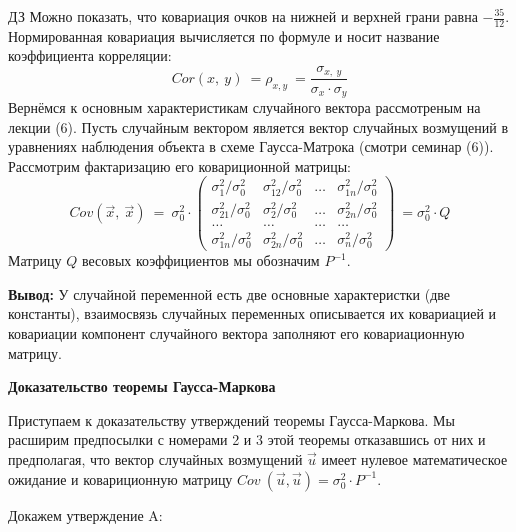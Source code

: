 \documentclass[12pt,a4paper]{article}
\begin{document}
\begin{center}
$\displaystyle \boxed{\text{ДЗ}}$ Можно показать, что ковариация очков на нижней и верхней грани равна $\displaystyle -\frac{35}{12}$. Нормированная ковариация вычисляется по формуле и носит название коэффициента корреляции:
\begin{equation*}
Cor( x,\ y) \ =\rho _{x,y} \ =\frac{\sigma _{x,\ y}}{\sigma _{x} \cdot \sigma _{y}}
\end{equation*}
Вернёмся к основным характеристикам случайного вектора рассмотреным на лекции (6). Пусть случайным вектором является вектор случайных возмущений в уравнениях наблюдения объекта в схеме Гаусса-Матрока (смотри семинар (6)). Рассмотрим фактаризацию его ковариционной матрицы:
\begin{equation*}
Cov\left(\vec{x} ,\ \vec{x}\right) \ =\ \sigma ^{2}_{0} \cdot \begin{pmatrix}
\sigma ^{2}_{1} /\sigma ^{2}_{0} & \sigma ^{2}_{12} /\sigma ^{2}_{0} & \dotsc  & \sigma ^{2}_{1n} /\sigma ^{2}_{0}\\
\sigma ^{2}_{21} /\sigma ^{2}_{0} & \sigma ^{2}_{2} /\sigma ^{2}_{0} & \dotsc  & \sigma ^{2}_{2n} /\sigma ^{2}_{0}\\
\dotsc  & \dotsc  & \dotsc  & \dotsc \\
\sigma ^{2}_{1n} /\sigma ^{2}_{0} & \sigma ^{2}_{2n} /\sigma ^{2}_{0} & \dotsc  & \sigma ^{2}_{n} /\sigma ^{2}_{0}
\end{pmatrix} \ =\sigma ^{2}_{0} \cdot Q
\end{equation*}
Матрицу $\displaystyle Q$ весовых коэффициентов мы обозначим $\displaystyle P^{-1}$.

\textbf{Вывод: }У случайной переменной есть две основные характеристки (две константы), взаимосвязь случайных переменных описывается их ковариацией и ковариации компонент случайного вектора заполняют его ковариационную матрицу.
\begin{center}
\textbf{Доказательство теоремы Гаусса-Маркова}
\end{center}
Приступаем к доказательству утверждений теоремы Гаусса-Маркова. Мы расширим предпосылки с номерами 2 и 3 этой теоремы отказавшись от них и предполагая, что вектор случайных возмущений $\displaystyle \vec{u}$ имеет нулевое математическое ожидание и ковариционную матрицу $\displaystyle Cov\ \left(\vec{u} ,\vec{u}\right) =\sigma ^{2}_{0} \cdot P^{-1}$.

Докажем утверждение A:


\end{center}
\end{document}
